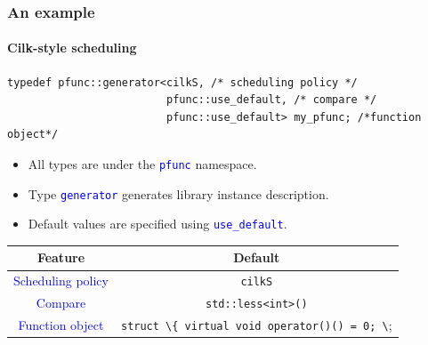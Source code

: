 \documentclass{beamer}
\newcommand{\code}[1]{\lstinline[basicstyle=\sffamily]{#1}}
\newcommand{\func}[1]{\lstinline[basicstyle=\sffamily]{#1()}}
\newcommand{\tablefont}{\fontsize{8}{13}\selectfont}
\begin{document}
\begin{frame}[fragile]
\frametitle{An example}
\framesubtitle{Cilk-style scheduling}
\begin{center}
\begin{minipage}{0.85\textwidth}
\begin{lstlisting}[basicstyle=\tablefont]
typedef pfunc::generator<cilkS, /* scheduling policy */
                         pfunc::use_default, /* compare */
                         pfunc::use_default> my_pfunc; /*function object*/
\end{lstlisting}
\end{minipage}
\end{center}
\begin{itemize}
\item All types are under the \textcolor{blue}{\code{pfunc}} namespace.
\item Type \textcolor{blue}{\code{generator}} generates library instance description.
\item Default values are specified using \textcolor{blue}{\code{use_default}}.
\end{itemize}
\begin{center}
\tablefont
\begin{tabular}{|c|c|}
\hline
Feature & Default \\
\hline
\textcolor{blue}{Scheduling policy} & \code{cilkS} \\
\hline
\textcolor{blue}{Compare} & \func{std::less<int>} \\
\hline 
\textcolor{blue}{Function object} & \code{struct \{ virtual void operator()() = 0; \};} \\
\hline
\end{tabular}
\normalsize
\end{center}
\end{frame}
\end{document}
